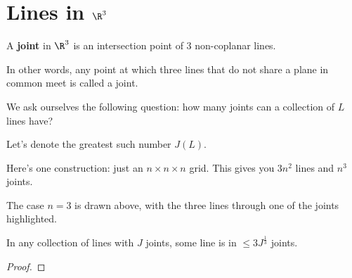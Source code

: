 \section{Lines in $\R^3$}

\begin{boxdefinition}[Joint]
    A \textbf{joint} in $\R^3$ is an intersection point of $3$ non-coplanar lines.
\end{boxdefinition}

In other words, any point at which three lines that do not share a plane in common meet is called a joint.

We ask ourselves the following question: how many joints can a collection of $L$ lines have?

Let's denote the greatest such number $J(L)$.

Here's one construction: just an $n \times n \times n$ grid. This gives you $3n^2$ lines and $n^3$ joints.

\begin{figure}[H]
    \centering
\end{figure}
The case $n = 3$ is drawn above, with the three lines through one of the joints highlighted.

\begin{boxlemma}
    In any collection of lines with $J$ joints, some line is in $\leq 3J^{\frac{1}{3}}$ joints.
\end{boxlemma}
\begin{proof}
    \sorry
\end{proof}

